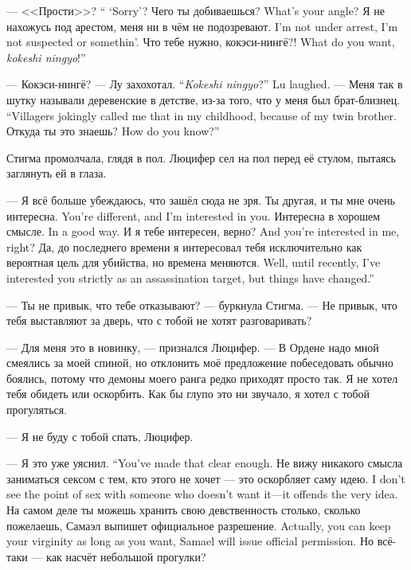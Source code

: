 {--- <<Прости>>?}
{`` `Sorry'?}
{Чего ты добиваешься?}
{What's your angle?}
{Я не нахожусь под арестом, меня ни в чём не подозревают.}
{I'm not under arrest, I'm not suspected or somethin'.}
{Что тебе нужно, кокэси-нингё\FM?!}
{What do you want, \textit{kokeshi ningyo}\FM!''}

{--- Кокэси-нингё? --- Лу захохотал.}
{``\textit{Kokeshi ningyo}?'' Lu laughed.}
{--- Меня так в шутку называли деревенские в детстве, из-за того, что у меня был брат-близнец.}
{``Villagers jokingly called me that in my childhood, because of my twin brother.}
{Откуда ты это знаешь?}
{How do you know?''}

Стигма промолчала, глядя в пол.
Люцифер сел на пол перед её стулом, пытаясь заглянуть ей в глаза.

--- Я всё больше убеждаюсь, что зашёл сюда не зря.
{Ты другая, и ты мне очень интересна.}
{You're different, and I'm interested in you.}
{Интересна в хорошем смысле.}
{In a good way.}
{И я тебе интересен, верно?}
{And you're interested in me, right?}
{Да, до последнего времени я интересовал тебя исключительно как вероятная цель для убийства, но времена меняются.}
{Well, until recently, I've interested you strictly as an assassination target, but things have changed.''}

--- Ты не привык, что тебе отказывают? --- буркнула Стигма.
--- Не привык, что тебя выставляют за дверь, что с тобой не хотят разговаривать?

--- Для меня это в новинку, --- признался Люцифер.
--- В Ордене надо мной смеялись за моей спиной, но отклонить моё предложение побеседовать обычно боялись, потому что демоны моего ранга редко приходят просто так.
Я не хотел тебя обидеть или оскорбить.
Как бы глупо это ни звучало, я хотел с тобой прогуляться.

--- Я не буду с тобой спать, Люцифер.

{--- Я это уже уяснил.}
{``You've made that clear enough.}
{Не вижу никакого смысла заниматься сексом с тем, кто этого не хочет --- это оскорбляет саму идею.}
{I don't see the point of sex with someone who doesn't want it---it offends the very idea.}
{На самом деле ты можешь хранить свою девственность столько, сколько пожелаешь, Самаэл выпишет официальное разрешение.}
{Actually, you can keep your virginity as long as you want, Samael will issue official permission.}
Но всё-таки --- как насчёт небольшой прогулки?

